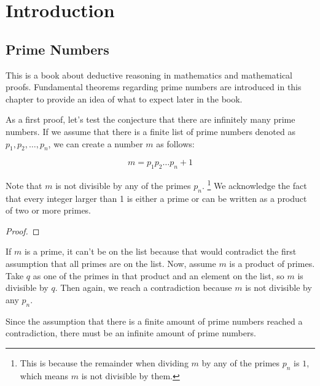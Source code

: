 \chapter{Introduction}

\section{Prime Numbers}
This is a book about deductive reasoning in mathematics and mathematical proofs. 
Fundamental theorems regarding prime numbers are introduced in this chapter to provide an idea of what to expect later in the book.

As a first proof, let's test the conjecture that there are infinitely many prime numbers.
If we assume that there is a finite list of prime numbers denoted as $p_1, p_2, \ldots, p_n$, we can create a number $m$ as follows:

\[
m = p_1p_2 \ldots p_n + 1
\]

Note that $m$ is not divisible by any of the primes $p_n$.
\footnote{This is because the remainder when dividing $m$ by any of the primes $p_n$ is $1$, 
which means $m$ is not divisible by them.}
We acknowledge the fact that every integer larger than 1 is either a prime or can be written as a product of two or more primes. 

\conjecture

\begin{proof}[Proof]

  
\end{proof}

If $m$ is a prime, it can't be on the list because that would contradict the first assumption that all primes are on the list. 
Now, assume $m$ is a product of primes. 
Take $q$ as one of the primes in that product and an element on the list, so $m$ is divisible by $q$. 
Then again, we reach a contradiction because $m$ is not divisible by any $p_n$.

Since the assumption that there is a finite amount of prime numbers reached a contradiction, there must be an infinite amount of prime numbers.



